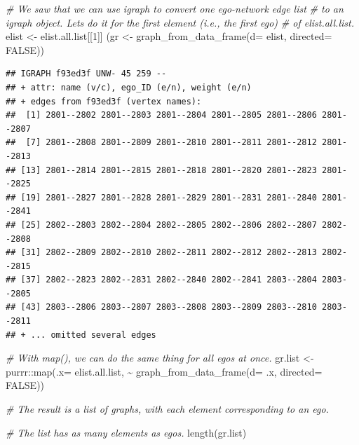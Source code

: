 \documentclass[
]{book}
\newenvironment{Shaded}{\begin{snugshade}}{\end{snugshade}}
\newcommand{\AttributeTok}[1]{\textcolor[rgb]{0.77,0.63,0.00}{#1}}
\newcommand{\CommentTok}[1]{\textcolor[rgb]{0.56,0.35,0.01}{\textit{#1}}}
\newcommand{\ConstantTok}[1]{\textcolor[rgb]{0.00,0.00,0.00}{#1}}
\newcommand{\DecValTok}[1]{\textcolor[rgb]{0.00,0.00,0.81}{#1}}
\newcommand{\FunctionTok}[1]{\textcolor[rgb]{0.00,0.00,0.00}{#1}}
\newcommand{\NormalTok}[1]{#1}
\newcommand{\OtherTok}[1]{\textcolor[rgb]{0.56,0.35,0.01}{#1}}
\newcommand{\SpecialCharTok}[1]{\textcolor[rgb]{0.00,0.00,0.00}{#1}}
\begin{document}
\begin{Shaded}
\begin{Highlighting}[]
\CommentTok{\# We saw that we can use igraph to convert one ego{-}network edge list}
\CommentTok{\# to an igraph object. Let\textquotesingle{}s do it for the first element (i.e., the first ego)}
\CommentTok{\# of elist.all.list.}
\NormalTok{elist }\OtherTok{\textless{}{-}}\NormalTok{ elist.all.list[[}\DecValTok{1}\NormalTok{]]}
\NormalTok{(gr }\OtherTok{\textless{}{-}} \FunctionTok{graph\_from\_data\_frame}\NormalTok{(}\AttributeTok{d=}\NormalTok{ elist, }\AttributeTok{directed=} \ConstantTok{FALSE}\NormalTok{))}
\end{Highlighting}
\end{Shaded}

\begin{verbatim}
## IGRAPH f93ed3f UNW- 45 259 -- 
## + attr: name (v/c), ego_ID (e/n), weight (e/n)
## + edges from f93ed3f (vertex names):
##  [1] 2801--2802 2801--2803 2801--2804 2801--2805 2801--2806 2801--2807
##  [7] 2801--2808 2801--2809 2801--2810 2801--2811 2801--2812 2801--2813
## [13] 2801--2814 2801--2815 2801--2818 2801--2820 2801--2823 2801--2825
## [19] 2801--2827 2801--2828 2801--2829 2801--2831 2801--2840 2801--2841
## [25] 2802--2803 2802--2804 2802--2805 2802--2806 2802--2807 2802--2808
## [31] 2802--2809 2802--2810 2802--2811 2802--2812 2802--2813 2802--2815
## [37] 2802--2823 2802--2831 2802--2840 2802--2841 2803--2804 2803--2805
## [43] 2803--2806 2803--2807 2803--2808 2803--2809 2803--2810 2803--2811
## + ... omitted several edges
\end{verbatim}

\begin{Shaded}
\begin{Highlighting}[]
\CommentTok{\# With map(), we can do the same thing for all egos at once.}
\NormalTok{gr.list }\OtherTok{\textless{}{-}}\NormalTok{ purrr}\SpecialCharTok{::}\FunctionTok{map}\NormalTok{(}\AttributeTok{.x=}\NormalTok{ elist.all.list, }
                      \SpecialCharTok{\textasciitilde{}} \FunctionTok{graph\_from\_data\_frame}\NormalTok{(}\AttributeTok{d=}\NormalTok{ .x, }\AttributeTok{directed=} \ConstantTok{FALSE}\NormalTok{))}

\CommentTok{\# The result is a list of graphs, with each element corresponding to an ego.}

\CommentTok{\# The list has as many elements as egos.}
\FunctionTok{length}\NormalTok{(gr.list)}
\end{Highlighting}
\end{Shaded}
\end{document}
